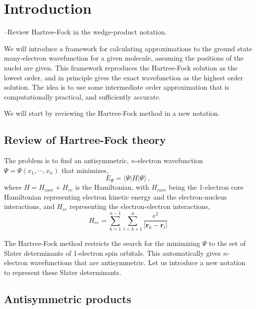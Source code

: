 \documentclass[11pt]{article}
\begin{document}
\section{Introduction}

--Review Hartree-Fock in the wedge-product notation.

We will introduce a framework for calculating approximations to 
the ground state many-electron wavefunction for a given molecule, 
assuming the positions of the nuclei are given. This framework
reproduces the Hartree-Fock solution as the lowest order, and in
principle gives the exact wavefunction as the highest order
solution. The idea is to use some intermediate order approximation
that is computationally practical, and sufficiently accurate. 

We will start by reviewing the Hartree-Fock method in a new notation.

\subsection{Review of Hartree-Fock theory}

The problem is to find an antisymmetric, $n$-electron wavefunction $\Psi =
\Psi(x_1, \cdots, x_n)$ that minimizes,
\begin{equation}
  E_\Psi = \langle \Psi | H | \Psi \rangle \,,
\end{equation}
where $H = H_{core} + H_{ee}$ is the Hamiltonian, with $H_{core}$
being the 1-electron core Hamiltonian representing electron kinetic energy
and the electron-nucleus interactions, and $H_{ee}$ representing the
electron-electron interactions,
\begin{equation}
  H_{ee} = \sum_{k=1}^{n-1} \sum_{l=k+1}^n \frac{e^2}{|\mathbf{r}_k - \mathbf{r}_l|}
\end{equation}

The Hartree-Fock method restricts the search for the 
minimizing $\Psi$ to the set of Slater determinants of 1-electron spin
orbitals. This automatically gives $n$-electron wavefunctions that are
antisymmetric. Let us introduce a new notation to represent these
Slater determinants.

\subsection{Antisymmetric products}
\end{document}
